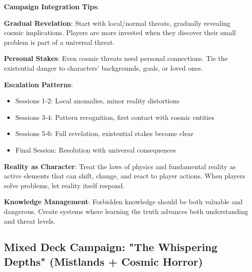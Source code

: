 \documentclass[11pt]{article}
\begin{document}
\begin{mdframed}[backgroundcolor=shadecolor]
\textbf{Campaign Integration Tips}:

\textbf{Gradual Revelation}:
Start with local/normal threats, gradually revealing cosmic implications. Players are more invested when they discover their small problem is part of a universal threat.

\textbf{Personal Stakes}:
Even cosmic threats need personal connections. Tie the existential danger to characters' backgrounds, goals, or loved ones.

\textbf{Escalation Patterns}:
\begin{itemize}[leftmargin=*]
\item Sessions 1-2: Local anomalies, minor reality distortions
\item Sessions 3-4: Pattern recognition, first contact with cosmic entities
\item Sessions 5-6: Full revelation, existential stakes become clear
\item Final Session: Resolution with universal consequences
\end{itemize}

\textbf{Reality as Character}:
Treat the laws of physics and fundamental reality as active elements that can shift, change, and react to player actions. When players solve problems, let reality itself respond.

\textbf{Knowledge Management}:
Forbidden knowledge should be both valuable and dangerous. Create systems where learning the truth advances both understanding and threat levels.
\end{mdframed}

\subsection*{Mixed Deck Campaign: "The Whispering Depths" (Mistlands + Cosmic Horror)}
\end{document}
